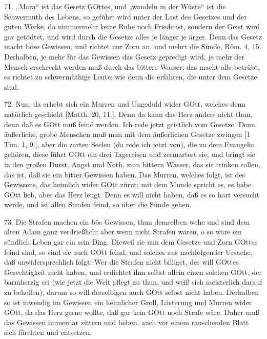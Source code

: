 71. „Mara“ ist das Gesetz GOttes, und „wandeln in der Wüste“ ist die Schwermuth des Lebens, so geführt wird unter der Last des Gesetzes und der guten Werke, da nimmermehr keine Ruhe noch Friede ist, sondern der Geist wird gar getödtet, und wird durch die Gesetze alles je länger je ärger. Denn das Gesetz macht böse Gewissen, und richtet nur Zorn an, und mehrt die Sünde, Röm. 4, 15. Derhalben, je mehr für das Gewissen das Gesetz gepredigt wird, je mehr der Mensch erschreckt werden muß durch das bittere Wasser; das macht alle betrübt, es richtet zu schwermüthige Leute; wie denn die erfahren, die unter dem Gesetze sind.

72. Nun, da erhebt sich ein Murren und Ungeduld wider GOtt, welches denn natürlich geschieht [Matth. 20, 11.]. Denn da kann das Herz anders nicht thun, denn daß es GOtt muß feind werden. Ich rede jetzt geistlich vom Gesetze. Denn äußerliche, grobe Menschen muß man mit dem äußerlichen Gesetze zwingen [1 Tim. 1, 9.], aber die zarten Seelen (da rede ich jetzt von), die zu dem Evangelio gehören, diese führt GOtt ein drei Tagereisen und zermartert sie, und bringt sie in den großen Durst, Angst und Noth, zum bittern Wasser, das sie trinken sollen, das ist, daß sie ein bitter Gewissen haben. Das Murren, welches folgt, ist des Gewissens, das heimlich wider GOtt zürnt; mit dem Munde spricht es, es habe GOtt lieb, aber das Herz leugt. Denn es will nicht haben, daß es so hart versucht werde, und ist allen Strafen feind, so über die Sünde gehen.

73. Die Strafen machen ein bös Gewissen, thun demselben wehe und sind dem alten Adam ganz verdrießlich; aber wenn nicht Strafen wären, o so wäre ein sündlich Leben gar ein
sein Ding. Dieweil sie nun dem Gesetze und Zorn GOttes feind sind, so sind sie auch GOtt feind, und solches aus nachfolgender Ursache, daß unwidersprechlich folgt: Wer die Strafen nicht billiget, der will GOttes Gerechtigkeit nicht haben, und erdichtet ihm selbst allein einen solchen GOtt, der barmherzig sei (wie jetzt die Welt pflegt zu thun, und weiß sich meisterlich darauf zu behelfen), darum so will derselbigen auch GOtt selbst nicht haben. Derhalben so ist inwendig im Gewissen ein heimlicher Groll, Lästerung und Murren wider GOtt, da das Herz gerne wollte, daß gar kein GOtt noch Strafe wäre. Daher muß das Gewissen immerdar zittern und beben, auch vor einem rauschenden Blatt sich fürchten und entsetzen.

